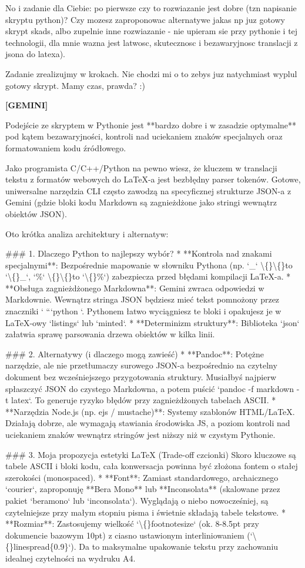 \documentclass[10pt,a4paper]{article}
\newcommand{\ModelTurn}{\textbf{[GEMINI]}\par\medskip}
\newcommand{\Separator}{\par\vspace{4pt}\noindent{\color{rulecolor}\rule{\linewidth}{0.4pt}}\par\vspace{6pt}}
\begin{document}
No i zadanie dla Ciebie: po pierwsze czy to rozwiazanie jest dobre (tzn napisanie skryptu python)? Czy mozesz zaproponowac alternatywe jakas np juz gotowy skrypt skads, albo zupelnie inne rozwiazanie - nie upieram sie przy pythonie i tej technologii, dla mnie wazna jest latwosc, skutecznosc i bezawaryjnosc translacji z jsona do latexa).

Zadanie zrealizujmy w krokach. Nie chodzi mi o to zebys juz natychmiast wyplul gotowy skrypt. Mamy czas, prawda? :)
\Separator
\ModelTurn
Podejście ze skryptem w Pythonie jest **bardzo dobre i w zasadzie optymalne** pod kątem bezawaryjności, kontroli nad uciekaniem znaków specjalnych oraz formatowaniem kodu źródłowego.

Jako programista C/C++/Python na pewno wiesz, że kluczem w translacji tekstu z formatów webowych do LaTeX-a jest bezbłędny parser tokenów. Gotowe, uniwersalne narzędzia CLI często zawodzą na specyficznej strukturze JSON-a z Gemini (gdzie bloki kodu Markdown są zagnieżdżone jako stringi wewnątrz obiektów JSON).

Oto krótka analiza architektury i alternatyw:

\#\#\# 1. Dlaczego Python to najlepszy wybór?
* **Kontrola nad znakami specjalnymi**: Bezpośrednie mapowanie w słowniku Pythona (np. `\_` \textbackslash\{\}\textbackslash\{\}to `\textbackslash\{\}\_`, `\%` \textbackslash\{\}\textbackslash\{\}to `\textbackslash\{\}\%`) zabezpiecza przed błędami kompilacji LaTeX-a.
* **Obsługa zagnieżdżonego Markdowna**: Gemini zwraca odpowiedzi w Markdownie. Wewnątrz stringa JSON będziesz mieć tekst pomnożony przez znaczniki ` ```python `. Pythonem łatwo wyciągniesz te bloki i opakujesz je w LaTeX-owy `listings` lub `minted`.
* **Determinizm struktury**: Biblioteka `json` załatwia sprawę parsowania drzewa obiektów w kilka linii.

\#\#\# 2. Alternatywy (i dlaczego mogą zawieść)
* **Pandoc**: Potężne narzędzie, ale nie przetłumaczy surowego JSON-a bezpośrednio na czytelny dokument bez wcześniejszego przygotowania struktury. Musiałbyś najpierw spłaszczyć JSON do czystego Markdowna, a potem puścić `pandoc -f markdown -t latex`. To generuje ryzyko błędów przy zagnieżdżonych tabelach ASCII.
* **Narzędzia Node.js (np. ejs / mustache)**: Systemy szablonów HTML/LaTeX. Działają dobrze, ale wymagają stawiania środowiska JS, a poziom kontroli nad uciekaniem znaków wewnątrz stringów jest niższy niż w czystym Pythonie.

\#\#\# 3. Moja propozycja estetyki LaTeX (Trade-off czcionki)
Skoro kluczowe są tabele ASCII i bloki kodu, cała konwersacja powinna być złożona fontem o stałej szerokości (monospaced).
* **Font**: Zamiast standardowego, archaicznego `courier`, zaproponuję **Bera Mono** lub **Inconsolata** (skalowane przez pakiet `beramono` lub `inconsolata`). Wyglądają o niebo nowocześniej, są czytelniejsze przy małym stopniu pisma i świetnie składają tabele tekstowe.
* **Rozmiar**: Zastosujemy wielkość `\textbackslash\{\}footnotesize` (ok. 8-8.5pt przy dokumencie bazowym 10pt) z ciasno ustawionym interliniowaniem (`\textbackslash\{\}linespread\{0.9\}`). Da to maksymalne upakowanie tekstu przy zachowaniu idealnej czytelności na wydruku A4.
\end{document}
